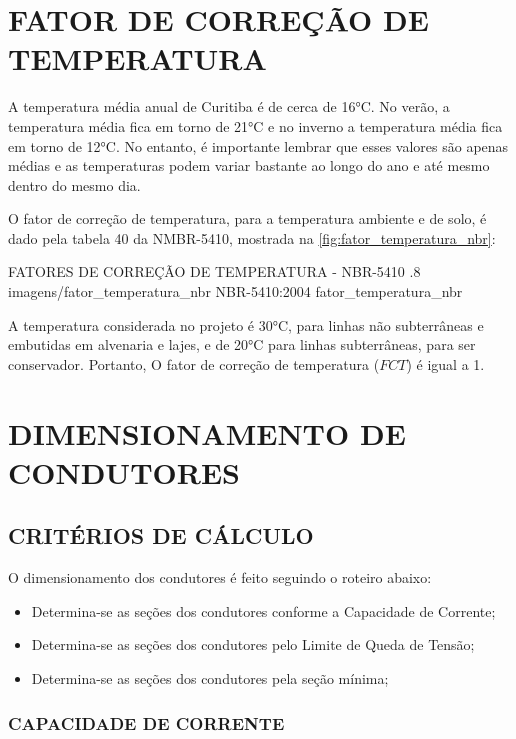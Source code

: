\section{FATOR DE CORREÇÃO DE TEMPERATURA}

A temperatura média anual de Curitiba é de cerca de 16°C. No verão, a temperatura média fica em torno de 21°C e no inverno a temperatura média fica em torno de 12°C. No entanto, é importante lembrar que esses valores são apenas médias e as temperaturas podem variar bastante ao longo do ano e até mesmo dentro do mesmo dia.

O fator de correção de temperatura, para a temperatura ambiente e de solo, é dado pela tabela 40 da NMBR-5410, mostrada na \autoref{fig:fator_temperatura_nbr}:

\figura
{FATORES DE CORREÇÃO DE TEMPERATURA - NBR-5410} %
{.8} %
{imagens/fator_temperatura_nbr} %
{NBR-5410:2004} %
{fator_temperatura_nbr} %
{}
{}

A temperatura considerada no projeto é 30°C, para linhas não subterrâneas e embutidas em alvenaria e lajes, e de 20°C para linhas subterrâneas, para ser conservador. Portanto, O fator de correção de temperatura ($FCT$) é igual a 1.

\section{DIMENSIONAMENTO DE CONDUTORES}

\subsection{CRITÉRIOS DE CÁLCULO}

O dimensionamento dos condutores é feito seguindo o roteiro abaixo:

\begin{itemize}
	\item Determina-se as seções dos condutores conforme a Capacidade de Corrente;
	\item Determina-se as seções dos condutores pelo Limite de Queda de Tensão;
	\item Determina-se as seções dos condutores pela seção mínima;
\end{itemize}

\subsubsection{CAPACIDADE DE CORRENTE}

